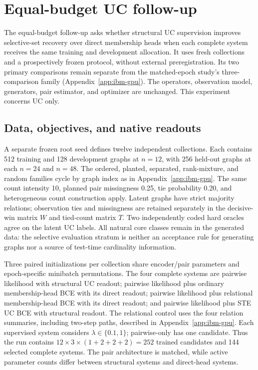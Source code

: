 \section{Equal-budget UC follow-up}\label{app:uc-equal-compute}
The equal-budget follow-up asks whether structural UC supervision improves selective-set recovery over direct membership heads when each complete system receives the same training and development allocation. It uses fresh collections and a prospectively frozen protocol, without external preregistration. Its two primary comparisons remain separate from the matched-epoch study's three-comparison family (Appendix~\ref{app:ibm-gpu}). The operators, observation model, generators, pair estimator, and optimizer are unchanged. This experiment concerns UC only.

\subsection{Data, objectives, and native readouts}
A separate frozen root seed defines twelve independent collections. Each contains 512 training and 128 development graphs at $n=12$, with 256 held-out graphs at each $n=24$ and $n=48$. The ordered, planted, separated, rank-mixture, and random families cycle by graph index as in Appendix~\ref{app:ibm-gpu}. The same count intensity 10, planned pair missingness 0.25, tie probability 0.20, and heterogeneous count construction apply. Latent graphs have strict majority relations; observation ties and missingness are retained separately in the decisive-win matrix $W$ and tied-count matrix $T$. Two independently coded hard oracles agree on the latent UC labels. All natural core classes remain in the generated data: the selective evaluation stratum is neither an acceptance rule for generating graphs nor a source of test-time cardinality information.

Three paired initializations per collection share encoder/pair parameters and epoch-specific minibatch permutations. The four complete systems are pairwise likelihood with structural UC readout; pairwise likelihood plus ordinary membership-head BCE with its direct readout; pairwise likelihood plus relational membership-head BCE with its direct readout; and pairwise likelihood plus STE UC BCE with structural readout. The relational control uses the four relation summaries, including two-step paths, described in Appendix~\ref{app:ibm-gpu}. Each supervised system considers $\lambda\in\{0.1,1\}$; pairwise-only has one candidate. Thus the run contains $12\times3\times(1+2+2+2)=252$ trained candidates and 144 selected complete systems. The pair architecture is matched, while active parameter counts differ between structural systems and direct-head systems.

